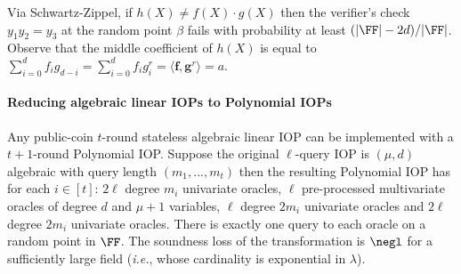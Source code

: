 Via Schwartz-Zippel, if $h(X) \neq f(X) \cdot g(X)$ then the verifier's check $y_1 y_2 = y_3$ at the random point $\beta$ fails with probability at least $(|\FF| - 2d)/|\FF|$. %
Observe that the middle coefficient of $h(X)$ is equal to $\sum_{i=0}^d f_i g_{d-i} = \sum_{i=0}^d f_i g^r_i = \langle \mathbf{f}, \mathbf{g}^r \rangle = a$.

\paragraph{Reducing algebraic linear IOPs to Polynomial IOPs} 
\label{sec:algebraicIOP}

\begin{theorem}\label{thm:algebraicIOPcompiler}
Any public-coin $t$-round stateless algebraic linear IOP can be implemented with a $t+1$-round Polynomial IOP. Suppose the original $\ell$-query IOP is $(\mu,d)$ algebraic with query length $(m_1,...,m_t)$ then the resulting Polynomial IOP has for each $i \in [t]$: $2\ell$ degree $m_i$ univariate oracles, $\ell$ pre-processed multivariate oracles of degree $d$ and $\mu+1$ variables, $\ell$ degree $2m_i$ univariate oracles %
and $2\ell$ degree $2m_i$ univariate oracles. %
There is exactly one query to each oracle on a random point in $\FF$. The soundness loss of the transformation is $\negl$ for a sufficiently large field (\emph{i.e.}, whose cardinality is exponential in $\lambda$).
\end{theorem}

